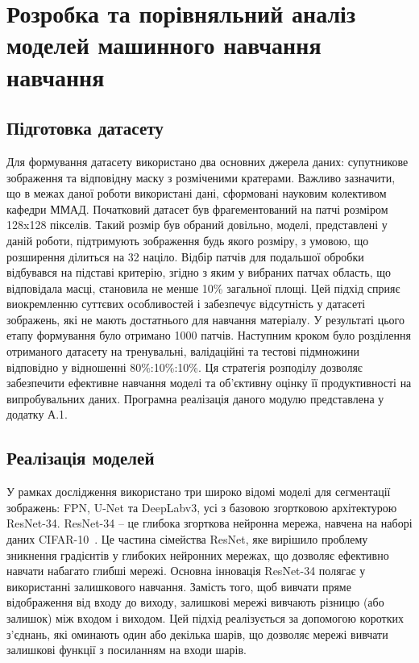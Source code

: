 \chapter{Розробка та порівняльний аналіз моделей машинного навчання навчання}
\label{chap:practice}

\section{Підготовка датасету}

Для формування датасету використано два основних джерела даних:
супутникове зображення та відповідну маску з розміченими кратерами.
Важливо зазначити, що в межах даної роботи використані дані,
сформовані науковим колективом кафедри ММАД.
Початковий датасет був фрагементований
на патчі розміром 128x128 пікселів. Такий розмір був обраний довільно,
моделі, представлені у даній роботи, підтримують зображення будь якого
розміру, з умовою, що розширення ділиться на 32 націло.
Відбір
патчів для подальшої обробки відбувався на підставі критерію, згідно
з яким у вибраних патчах область, що відповідала масці, становила не
менше 10\% загальної площі. Цей підхід сприяє виокремленню
суттєвих особливостей і забезпечує відсутність у датасеті
зображень, які не мають достатнього для навчання матеріалу. У результаті цього етапу формування
було отримано 1000 патчів. Наступним кроком було розділення
отриманого датасету на тренувальні, валідаційні та тестові підмножини
відповідно у відношенні 80\%:10\%:10\%. Ця стратегія розподілу дозволяє
забезпечити ефективне навчання моделі та об'єктивну оцінку її продуктивності
на випробувальних даних. Програмна реалізація даного модулю представлена у додатку А.1.

\section{Реалізація моделей}

У рамках дослідження використано три широко відомі моделі для
сегментації зображень: FPN, U-Net та DeepLabv3,
усі з базовою згортковою архітектурою ResNet-34.
ResNet-34 -- це глибока згорткова нейронна мережа, навчена на наборі
даних CIFAR-10~\cite{he2015}. Це частина сімейства ResNet,
яке вирішило проблему зникнення градієнтів у глибоких
нейронних мережах, що дозволяє ефективно навчати набагато
глибші мережі. Основна інновація ResNet-34 полягає
у використанні залишкового навчання. Замість того, щоб
вивчати пряме відображення від входу до виходу, залишкові
мережі вивчають різницю (або залишок) між входом і виходом.
Цей підхід реалізується за допомогою коротких з'єднань,
які оминають один або декілька шарів, що дозволяє мережі
вивчати залишкові функції з посиланням на входи шарів.

